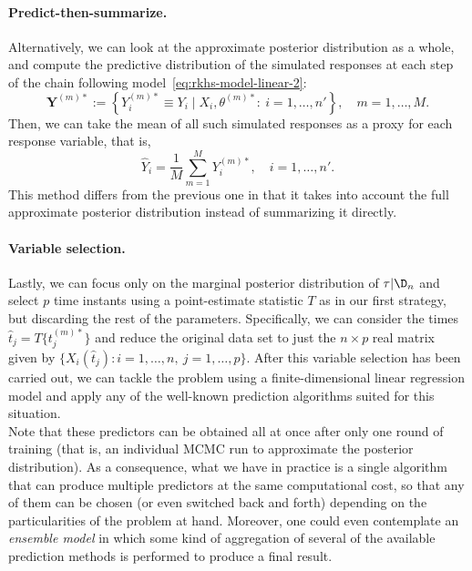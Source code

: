   \paragraph{Predict-then-summarize.} Alternatively, we can  look at the approximate posterior distribution as a whole, and compute the predictive distribution of the simulated responses at each step of the chain following model~\eqref{eq:rkhs-model-linear-2}:
  \begin{equation}\label{eq:sampled-response-vector}
  \symbf Y^{(m)*} := \left\{Y_i^{(m)*} \equiv Y_i \mid X_i, \theta^{(m)*}:\ i=1,\dots,n'\right\}, \quad m=1,\dots,M.
  \end{equation}
  Then, we can take the mean of all such simulated responses as a proxy for each response variable, that is,
  \[
  \hat Y_i = \frac{1}{M}\sum_{m=1}^M Y_i^{(m)*}, \quad i=1,\dots,n'.
  \]
  This method differs from the previous one in that it takes into account the full approximate posterior distribution instead of summarizing it directly.

  \paragraph{Variable selection.} Lastly, we can focus only on the marginal posterior distribution of \(\tau|\D_n\) and select \(p\) time instants using a point-estimate statistic \(T\) as in our first strategy, but discarding the rest of the parameters. Specifically, we can consider the times \(\hat t_j = T\{t_j^{(m)*}\}\) and reduce the original data set to just the \(n\times p\) real matrix given by \(\{X_i(\hat t_j): i=1, \dots,n, \ j=1,\dots,p\}\). After this variable selection has been carried out, we can tackle the problem using a finite-dimensional linear regression model and apply any of the well-known prediction algorithms suited for this situation.\\

Note that these predictors can be obtained all at once after only one round of training (that is, an individual MCMC run to approximate the posterior distribution). As a consequence, what we have in practice is a single algorithm that can produce multiple predictors at the same computational cost, so that any of them can be chosen (or even switched back and forth) depending on the particularities of the problem at hand. Moreover, one could even contemplate an \textit{ensemble model} in which some kind of aggregation of several of the available prediction methods is performed to produce a final result.

